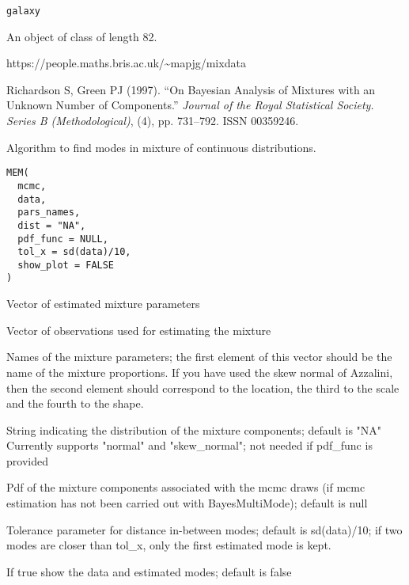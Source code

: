 \documentclass[a4paper]{book}
\begin{document}
%
\begin{Usage}
\begin{verbatim}
galaxy
\end{verbatim}
\end{Usage}
%
\begin{Format}
An object of class  of length 82.
\end{Format}
%
\begin{Source}\relax
https://people.maths.bris.ac.uk/\textasciitilde{}mapjg/mixdata
\end{Source}
%
\begin{References}\relax
Richardson S, Green PJ (1997).
``On Bayesian Analysis of Mixtures with an Unknown Number of Components.''
\emph{Journal of the Royal Statistical Society. Series B (Methodological)}, (4), pp. 731--792.
ISSN 00359246.
\end{References}
%
\begin{Description}\relax
Algorithm to find modes in mixture of continuous distributions.
\end{Description}
%
\begin{Usage}
\begin{verbatim}
MEM(
  mcmc,
  data,
  pars_names,
  dist = "NA",
  pdf_func = NULL,
  tol_x = sd(data)/10,
  show_plot = FALSE
)
\end{verbatim}
\end{Usage}
%
\begin{Arguments}
\begin{ldescription}
\item[\code{mcmc}] Vector of estimated mixture parameters

\item[\code{data}] Vector of observations used for estimating the mixture

\item[\code{pars\_names}] Names of the mixture parameters; the first element of 
this vector should be the name of the mixture proportions. If you have used 
the skew normal of Azzalini, then the second element should correspond to the location,
the third to the scale and the fourth to the shape.

\item[\code{dist}] String indicating the distribution of the mixture components; default is "NA"
Currently supports "normal" and "skew\_normal"; not needed if pdf\_func is provided

\item[\code{pdf\_func}] Pdf of the mixture components associated with the mcmc draws
(if mcmc estimation has not been carried out with BayesMultiMode); default is null

\item[\code{tol\_x}] Tolerance parameter for distance in-between modes; default is sd(data)/10; if two modes are closer than tol\_x, only the first estimated mode is kept.

\item[\code{show\_plot}] If true show the data and estimated modes; default is false
\end{ldescription}
\end{Arguments}
\end{document}
